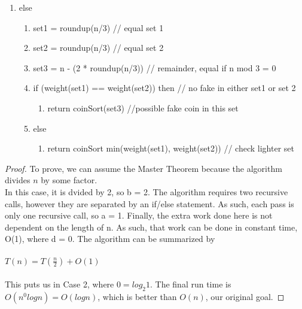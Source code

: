 \documentclass{article}
\begin{document}
\begin{enumerate}
\begin{enumerate}[\indent {}]
      \item else
      \begin{enumerate}[\indent {}]
        \item set1 = roundup(n/3) // equal set 1
        \item set2 = roundup(n/3) // equal set 2
        \item set3 = n - (2 * roundup(n/3)) // remainder, equal if n mod 3 = 0
        \item if (weight(set1) == weight(set2)) then // no fake in either set1 or set 2
          \begin{enumerate}[\indent {}]
            \item return coinSort(set3) //possible fake coin in this set
          \end{enumerate}
        \item else
\begin{enumerate}[\indent {}]
  \item return coinSort min(weight(set1), weight(set2)) // check lighter set

\end{enumerate}
      \end{enumerate}
    \end{enumerate}

\begin{proof} To prove, we can assume the Master Theorem because the algorithm divides $n$ by some factor.\\
  In this case, it is dvided by 2, so b = 2. The algorithm requires two recursive calls, however they are separated
  by an if/else statement. As such, each pass is only one recursive call, so a = 1. Finally, the extra work done
  here is not dependent on the length of n. As such, that work can be done in constant time, O(1), where d = 0.
  The algorithm can be summarized by\\\\ $T(n)=T(\frac n 2) + O(1)$\\\\
  This puts us in Case 2, where $0=log_2 1$. The final run time is $O(n^0 log n) = O(log n)$, which is better than
  $O(n)$, our original goal.

\end{proof}
\end{enumerate}
\end{document}
